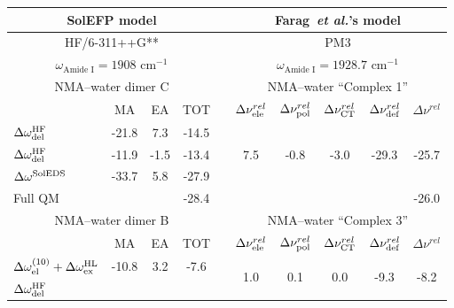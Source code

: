 \documentclass[a4paper,titlepage,twoside,fleqn,12pt]{book}
\begin{document}
\begin{refsection}
\begin{table}[t!]
{\label{t:farag}}
\begin{tabular*}{1.0\textwidth}{@{\extracolsep{\fill} } lccccccccc}
\hline\hline
\multicolumn{4}{c}{SolEFP model}       && \multicolumn{5}{c}{Farag~\emph{et al.}'s model} \\
\hline
\multicolumn{4}{c}{HF/6-311++G**}      && \multicolumn{5}{c}{PM3} \\
   \multicolumn{4}{c}{$\omega_{\text{Amide I}}=1908\text{ cm}^{-1}$}      
&& \multicolumn{5}{c}{$\omega_{\text{Amide I}}=1928.7\text{ cm}^{-1}$} \\
%
\hline
%
\multicolumn{4}{c}{NMA--water dimer C} && \multicolumn{5}{c}{NMA--water ``Complex 1''} \\
\cline{1-4} \cline{6-10}
 & MA & EA & TOT && $\Delta\nu_{\rm ele}^{rel}$ & $\Delta\nu_{\rm pol}^{rel}$ & $\Delta\nu_{\rm CT}^{rel}$ & $\Delta\nu_{\rm def}^{rel}$ &
                       $\Delta\nu^{rel}$ \\
\cline{2-4} \cline{6-10}
 $\Delta\omega^{\rm HF}_{\rm del}$  
          & -21.8 &  7.3  & -14.5 && \multirow{3}{*}{  7.5} &
                                     \multirow{3}{*}{ -0.8} &
                                     \multirow{3}{*}{ -3.0} &
                                     \multirow{3}{*}{-29.3} &
                                     \multirow{3}{*}{-25.7} \\ 
 $\Delta\omega^{\rm HF}_{\rm del}$    
          & -11.9 & -1.5  & -13.4 && & & & &       \\
 $\Delta\omega^{\rm SolEDS}$    
          & -33.7 &  5.8  & -27.9 && & & & &       \\
 Full QM  &      &        & -28.4 && & & & & -26.0 \\
%
\hline
%
\multicolumn{4}{c}{NMA--water dimer B} && \multicolumn{5}{c}{NMA--water ``Complex 3''} \\
\cline{1-4} \cline{6-10}
 & MA & EA & TOT && $\Delta\nu_{\rm ele}^{rel}$ & $\Delta\nu_{\rm pol}^{rel}$ & $\Delta\nu_{\rm CT}^{rel}$ & $\Delta\nu_{\rm def}^{rel}$ &
                       $\Delta\nu^{rel}$ \\
\cline{2-4} \cline{6-10}
 $\Delta\omega^{(10)}_{\rm el}+\Delta\omega^{\rm HL}_{\rm ex}$ 
          & -10.8 &  3.2  &  -7.6 && \multirow{3}{*}{  1.0} &
                                     \multirow{3}{*}{  0.1} &
                                     \multirow{3}{*}{  0.0} &
                                     \multirow{3}{*}{ -9.3} &
                                     \multirow{3}{*}{ -8.2} \\ 
 $\Delta\omega^{\rm HF}_{\rm del}$    

\end{tabular*}
\end{table}
\end{refsection}
\end{document}
